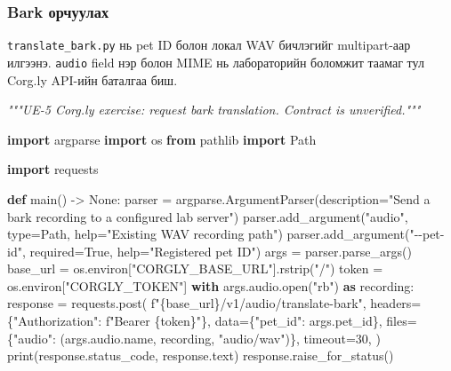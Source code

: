 \documentclass[
  mongolian,
]{article}
\newenvironment{Shaded}{}{}
\newcommand{\BuiltInTok}[1]{\textcolor[rgb]{0.00,0.50,0.00}{#1}}
\newcommand{\CommentTok}[1]{\textcolor[rgb]{0.38,0.63,0.69}{\textit{#1}}}
\newcommand{\ControlFlowTok}[1]{\textcolor[rgb]{0.00,0.44,0.13}{\textbf{#1}}}
\newcommand{\DecValTok}[1]{\textcolor[rgb]{0.25,0.63,0.44}{#1}}
\newcommand{\ImportTok}[1]{\textcolor[rgb]{0.00,0.50,0.00}{\textbf{#1}}}
\newcommand{\KeywordTok}[1]{\textcolor[rgb]{0.00,0.44,0.13}{\textbf{#1}}}
\newcommand{\NormalTok}[1]{#1}
\newcommand{\OperatorTok}[1]{\textcolor[rgb]{0.40,0.40,0.40}{#1}}
\newcommand{\SpecialCharTok}[1]{\textcolor[rgb]{0.25,0.44,0.63}{#1}}
\newcommand{\SpecialStringTok}[1]{\textcolor[rgb]{0.73,0.40,0.53}{#1}}
\newcommand{\StringTok}[1]{\textcolor[rgb]{0.25,0.44,0.63}{#1}}
\newcommand{\VariableTok}[1]{\textcolor[rgb]{0.10,0.09,0.49}{#1}}
\begin{document}
\subsubsection{Bark
орчуулах}\label{bark-ux43eux440ux447ux443ux443ux43bux430ux445}

\texttt{translate\_bark.py} нь pet ID болон локал WAV бичлэгийг
multipart-аар илгээнэ. \texttt{audio} field нэр болон MIME нь
лабораторийн боломжит таамаг тул Corg.ly API-ийн баталгаа биш.

\begin{Shaded}
\begin{Highlighting}[]
\CommentTok{"""UE{-}5 Corg.ly exercise: request bark translation. Contract is unverified."""}

\ImportTok{import}\NormalTok{ argparse}
\ImportTok{import}\NormalTok{ os}
\ImportTok{from}\NormalTok{ pathlib }\ImportTok{import}\NormalTok{ Path}

\ImportTok{import}\NormalTok{ requests}


\KeywordTok{def}\NormalTok{ main() }\OperatorTok{{-}\textgreater{}} \VariableTok{None}\NormalTok{:}
\NormalTok{    parser }\OperatorTok{=}\NormalTok{ argparse.ArgumentParser(description}\OperatorTok{=}\StringTok{"Send a bark recording to a configured lab server"}\NormalTok{)}
\NormalTok{    parser.add\_argument(}\StringTok{"audio"}\NormalTok{, }\BuiltInTok{type}\OperatorTok{=}\NormalTok{Path, }\BuiltInTok{help}\OperatorTok{=}\StringTok{"Existing WAV recording path"}\NormalTok{)}
\NormalTok{    parser.add\_argument(}\StringTok{"{-}{-}pet{-}id"}\NormalTok{, required}\OperatorTok{=}\VariableTok{True}\NormalTok{, }\BuiltInTok{help}\OperatorTok{=}\StringTok{"Registered pet ID"}\NormalTok{)}
\NormalTok{    args }\OperatorTok{=}\NormalTok{ parser.parse\_args()}
\NormalTok{    base\_url }\OperatorTok{=}\NormalTok{ os.environ[}\StringTok{"CORGLY\_BASE\_URL"}\NormalTok{].rstrip(}\StringTok{"/"}\NormalTok{)}
\NormalTok{    token }\OperatorTok{=}\NormalTok{ os.environ[}\StringTok{"CORGLY\_TOKEN"}\NormalTok{]}
    \ControlFlowTok{with}\NormalTok{ args.audio.}\BuiltInTok{open}\NormalTok{(}\StringTok{"rb"}\NormalTok{) }\ImportTok{as}\NormalTok{ recording:}
\NormalTok{        response }\OperatorTok{=}\NormalTok{ requests.post(}
            \SpecialStringTok{f"}\SpecialCharTok{\{}\NormalTok{base\_url}\SpecialCharTok{\}}\SpecialStringTok{/v1/audio/translate{-}bark"}\NormalTok{,}
\NormalTok{            headers}\OperatorTok{=}\NormalTok{\{}\StringTok{"Authorization"}\NormalTok{: }\SpecialStringTok{f"Bearer }\SpecialCharTok{\{}\NormalTok{token}\SpecialCharTok{\}}\SpecialStringTok{"}\NormalTok{\},}
\NormalTok{            data}\OperatorTok{=}\NormalTok{\{}\StringTok{"pet\_id"}\NormalTok{: args.pet\_id\},}
\NormalTok{            files}\OperatorTok{=}\NormalTok{\{}\StringTok{"audio"}\NormalTok{: (args.audio.name, recording, }\StringTok{"audio/wav"}\NormalTok{)\},}
\NormalTok{            timeout}\OperatorTok{=}\DecValTok{30}\NormalTok{,}
\NormalTok{        )}
    \BuiltInTok{print}\NormalTok{(response.status\_code, response.text)}
\NormalTok{    response.raise\_for\_status()}



\end{Highlighting}
\end{Shaded}
\end{document}
